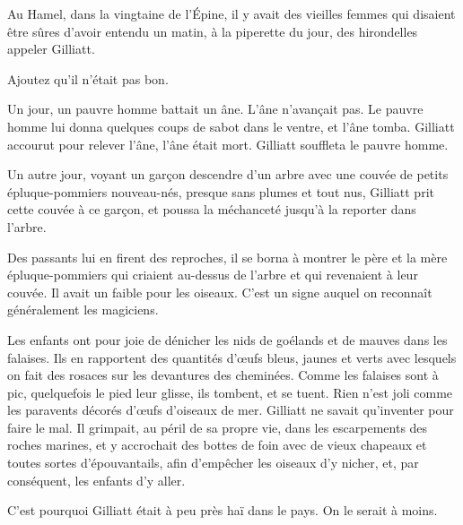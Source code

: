 \documentclass[french,twoside]{book} %
\begin{document}
Au Hamel, dans la vingtaine de l’Épine, il y avait des vieilles femmes qui disaient être sûres d’avoir entendu un matin, à la piperette du jour, des hirondelles appeler Gilliatt.\par
Ajoutez qu’il n’était pas bon.\par
Un jour, un pauvre homme battait un âne. L’âne n’avançait pas. Le pauvre homme lui donna quelques  coups de sabot dans le ventre, et l’âne tomba. Gilliatt accourut pour relever l’âne, l’âne était mort. Gilliatt souffleta le pauvre homme.\par
Un autre jour, voyant un garçon descendre d’un arbre avec une couvée de petits épluque-pommiers nouveau-nés, presque sans plumes et tout nus, Gilliatt prit cette couvée à ce garçon, et poussa la méchanceté jusqu’à la reporter dans l’arbre.\par
Des passants lui en firent des reproches, il se borna à montrer le père et la mère épluque-pommiers qui criaient au-dessus de l’arbre et qui revenaient à leur couvée. Il avait un faible pour les oiseaux. C’est un signe auquel on reconnaît généralement les magiciens.\par
Les enfants ont pour joie de dénicher les nids de goélands et de mauves dans les falaises. Ils en rapportent des quantités d’œufs bleus, jaunes et verts avec lesquels on fait des rosaces sur les devantures des cheminées. Comme les falaises sont à pic, quelquefois le pied leur glisse, ils tombent, et se tuent. Rien n’est joli comme les paravents décorés d’œufs d’oiseaux de mer. Gilliatt ne savait qu’inventer pour faire le mal. Il grimpait, au péril de sa propre vie, dans les escarpements des roches marines, et y accrochait des bottes de foin avec de vieux chapeaux et toutes sortes d’épouvantails, afin d’empêcher les oiseaux d’y nicher, et, par conséquent, les enfants d’y aller.\par
C’est pourquoi Gilliatt était à peu près haï dans le pays. On le serait à moins.
\end{document}
